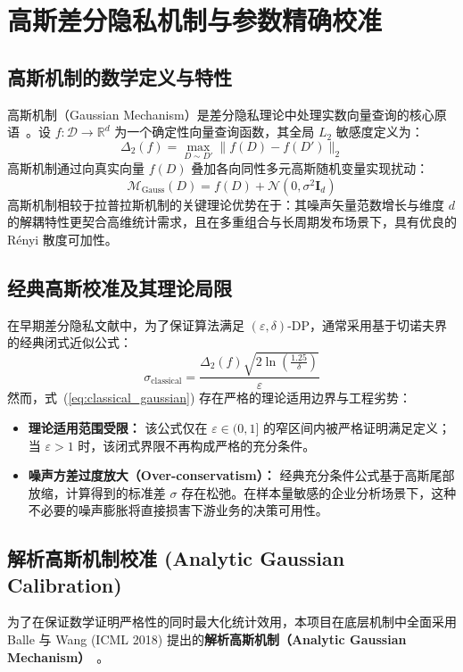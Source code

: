 \section{高斯差分隐私机制与参数精确校准}
\label{sec:gaussian}

\subsection{高斯机制的数学定义与特性}
高斯机制（Gaussian Mechanism）是差分隐私理论中处理实数向量查询的核心原语~\cite{dwork2006calibrating, dwork2014algorithmic}。设 $f: \mathcal{D} \to \mathbb{R}^d$ 为一个确定性向量查询函数，其全局 $L_2$ 敏感度定义为：
\begin{equation}
  \Delta_2(f) = \max_{D \sim D'} \|f(D) - f(D')\|_2
\end{equation}
高斯机制通过向真实向量 $f(D)$ 叠加各向同性多元高斯随机变量实现扰动：
\begin{equation}
  \mathcal{M}_{\text{Gauss}}(D) = f(D) + \mathcal{N}\left(0, \sigma^2 \mathbf{I}_d\right)
\end{equation}
高斯机制相较于拉普拉斯机制的关键理论优势在于：其噪声矢量范数增长与维度 $d$ 的解耦特性更契合高维统计需求，且在多重组合与长周期发布场景下，具有优良的 Rényi 散度可加性。

\subsection{经典高斯校准及其理论局限}
在早期差分隐私文献中，为了保证算法满足 $(\varepsilon, \delta)$-DP，通常采用基于切诺夫界的经典闭式近似公式：
\begin{equation}
  \label{eq:classical_gaussian}
  \sigma_{\text{classical}} = \frac{\Delta_2(f) \sqrt{2 \ln\left(\frac{1.25}{\delta}\right)}}{\varepsilon}
\end{equation}
然而，式~(\ref{eq:classical_gaussian}) 存在严格的理论适用边界与工程劣势：
\begin{itemize}[leftmargin=2em]
  \item \textbf{理论适用范围受限：} 该公式仅在 $\varepsilon \in (0, 1]$ 的窄区间内被严格证明满足定义；当 $\varepsilon > 1$ 时，该闭式界限不再构成严格的充分条件。
  \item \textbf{噪声方差过度放大（Over-conservatism）：} 经典充分条件公式基于高斯尾部放缩，计算得到的标准差 $\sigma$ 存在松弛。在样本量敏感的企业分析场景下，这种不必要的噪声膨胀将直接损害下游业务的决策可用性。
\end{itemize}

\subsection{解析高斯机制校准 (Analytic Gaussian Calibration)}
为了在保证数学证明严格性的同时最大化统计效用，本项目在底层机制中全面采用 Balle 与 Wang (ICML 2018) 提出的\textbf{解析高斯机制（Analytic Gaussian Mechanism）}~\cite{balle2018improving}。

